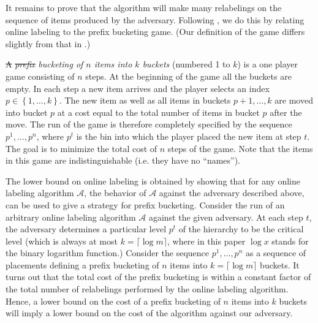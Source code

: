 \documentclass[unicode,review]{siamart1116}
\newcommand{\A}{\mathcal{A}}
\newcommand{\natInt}[2]{ \left\{ #1, \dotsc, #2 \right\} }
\numberwithin{theorem}{section}
\providecommand{\DIFadd}[1]{{\protect\color{blue}\uwave{#1}}} %
\providecommand{\DIFdel}[1]{{\protect\color{red}\sout{#1}}}                      %
\providecommand{\DIFaddbegin}{} %
\providecommand{\DIFaddend}{} %
\providecommand{\DIFdelbegin}{} %
\providecommand{\DIFdelend}{} %
\newcommand{\DIFscaledelfig}{0.5}
\newlength{\DIFdelgraphicswidth} %
\newlength{\DIFdelgraphicsheight} %
\newcommand{\DIFaddincludegraphics}[2][]{{\color{blue}\fbox{\DIFOincludegraphics[#1]{#2}}}} %
\newcommand{\DIFdelincludegraphics}[2][]{%
\sbox{\DIFdelgraphicsbox}{\DIFOincludegraphics[#1]{#2}}%
\settoboxwidth{\DIFdelgraphicswidth}{\DIFdelgraphicsbox} %
\settoboxtotalheight{\DIFdelgraphicsheight}{\DIFdelgraphicsbox} %
\scalebox{\DIFscaledelfig}{%
\parbox[b]{\DIFdelgraphicswidth}{\usebox{\DIFdelgraphicsbox}\\[-\baselineskip] \rule{\DIFdelgraphicswidth}{0em}}\llap{\resizebox{\DIFdelgraphicswidth}{\DIFdelgraphicsheight}{%
\setlength{\unitlength}{\DIFdelgraphicswidth}%
\begin{picture}(1,1)%
\thicklines\linethickness{2pt} %
{\color[rgb]{1,0,0}\put(0,0){\framebox(1,1){}}}%
{\color[rgb]{1,0,0}\put(0,0){\line( 1,1){1}}}%
{\color[rgb]{1,0,0}\put(0,1){\line(1,-1){1}}}%
\end{picture}%
}\hspace*{3pt}}} %
} %
\DeclareRobustCommand{\DIFaddbegin}{\DIFOaddbegin \let\includegraphics\DIFaddincludegraphics} %
\DeclareRobustCommand{\DIFaddend}{\DIFOaddend \let\includegraphics\DIFOincludegraphics} %
\DeclareRobustCommand{\DIFdelbegin}{\DIFOdelbegin \let\includegraphics\DIFdelincludegraphics} %
\DeclareRobustCommand{\DIFdelend}{\DIFOaddend \let\includegraphics\DIFOincludegraphics} %
\begin{document}
It remains to prove that the algorithm will make many relabelings on the sequence
of items produced by the adversary.  Following  \cite{DSZ04}, we 
do this by relating online labeling to the prefix bucketing game.
(Our definition of the game differs slightly from that in \cite{DSZ04}.)

\DIFdelbegin \DIFdel{A }\DIFdelend \emph{\DIFdelbegin \DIFdel{prefix }\DIFdelend \DIFaddbegin \DIFadd{Prefix }\DIFaddend bucketing of $n$ items into $k$ buckets} (numbered 1 to $k$) is a one player game consisting of $n$ steps.
At the beginning of the game
all the buckets are empty. In each step a new item arrives and the player selects an index $p \in \natInt{1}{k}$.
The new item as well as all items in buckets $p+1,\dotsc,k$ are moved into bucket $p$ at a cost equal to the
total number of items in bucket $p$ after the move.   The run of the game is therefore completely specified by
the sequence $p^1,\ldots,p^n$, where $p^t$ is the bin into which the player placed the new item at step $t$. 
The goal is to minimize the total cost of $n$ steps
of the game.   
Note that the items in this game are indistinguishable (i.e. they have no ``names'').

The lower bound on online labeling is obtained by showing that for any online
labeling algorithm $\A$, the behavior of $\A$ against the adversary described above, can be used to
give a strategy for prefix bucketing.
Consider the run of an arbitrary online labeling algorithm $\A$
against the given adversary.  At each step $t$, the adversary determines a particular
level $p^t$ of the hierarchy to be the critical level (which is always at most $k=\lceil \log m \rceil$,
where in this paper $\log x$ stands for the binary logarithm function.)
 Consider the sequence $p^1,\ldots,p^n$ as a  sequence of placements defining a prefix bucketing
of $n$ items into $k=\lceil \log m \rceil$ buckets. It turns out that
the total cost of the prefix bucketing is within a constant factor of  the total number of relabelings
performed by the online labeling algorithm. Hence, a lower bound on the cost of a prefix bucketing of $n$ items into $k$
buckets will imply a lower bound on the cost of the algorithm against our adversary.
\end{document}
